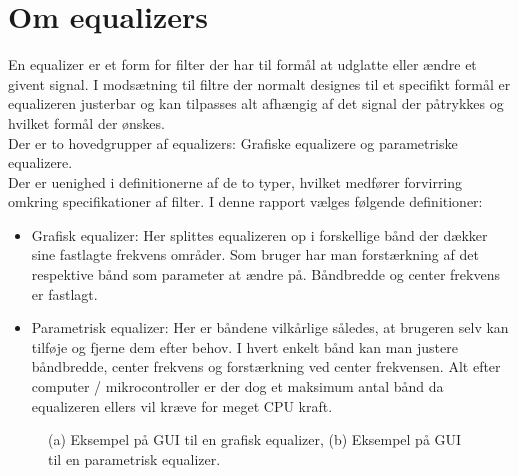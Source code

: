 \section{Om equalizers}\label{sec:equalizer}

En equalizer er et form for filter der har til formål at udglatte eller ændre et givent signal. I modsætning til filtre der normalt designes til et specifikt formål er equalizeren justerbar og kan tilpasses alt afhængig af det signal der påtrykkes og hvilket formål der ønskes.\\

Der er to hovedgrupper af equalizers: Grafiske equalizere og parametriske equalizere.\\
Der er uenighed i definitionerne af de to typer, hvilket medfører forvirring omkring specifikationer af filter. I denne rapport vælges følgende definitioner:

\begin{itemize}
	\item Grafisk equalizer: Her splittes equalizeren op i forskellige bånd der dækker sine fastlagte frekvens områder. Som bruger har man forstærkning af det respektive bånd som parameter at ændre på. Båndbredde og center frekvens er fastlagt.
	\item Parametrisk equalizer: Her er båndene vilkårlige således, at brugeren selv kan tilføje og fjerne dem efter behov. I hvert enkelt bånd kan man justere båndbredde, center frekvens og forstærkning ved center frekvensen. Alt efter computer / mikrocontroller er der dog et maksimum antal bånd da equalizeren ellers vil kræve for meget CPU kraft. 
\end{itemize}  

\begin{figure}[h]
	\centering
  	\caption{(a) Eksempel på GUI til en grafisk equalizer\protect\footnotemark, (b) Eksempel på GUI til en parametrisk equalizer.\protect\footnotemark}
	\label{fig:om_eq}
\end{figure}
\FloatBlock

